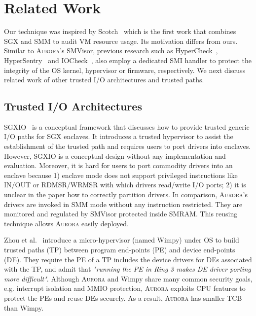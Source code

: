 \section{Related Work}
Our technique was inspired by Scotch~\cite{DBLP:conf/raid/LeachZW17} which is the first work that combines SGX and SMM to audit VM resource usage. Its motivation differs from ours.
Similar to \textsc{Aurora}'s SMVisor, previous research such as HyperCheck~\cite{DBLP:conf/raid/WangSG10}, HyperSentry~\cite{DBLP:conf/ccs/AzabNWJZS10} and IOCheck~\cite{DBLP:conf/esorics/ZhangWLS14}, also employ a dedicated SMI handler to protect the integrity of the OS kernel, hypervisor or firmware, respectively.
We next discuss related work of other trusted I/O architectures and trusted paths.

\subsection{Trusted I/O Architectures}
SGXIO~\cite{weiser_sgxio:_2017} is a conceptual framework that discusses how to provide trusted generic I/O paths for SGX enclaves. It introduces a trusted hypervisor to assist the establishment of the trusted path and requires users to port drivers into enclaves. However, SGXIO is a conceptual design without any implementation and evaluation. Moreover, it is hard for users to port commodity drivers into an enclave because 1) enclave mode does not support privileged instructions like IN/OUT or RDMSR/WRMSR with which drivers read/write I/O ports; 2) it is unclear in the paper \cite{weiser_sgxio:_2017} how to correctly partition drivers. In comparison, \textsc{Aurora}'s drivers are invoked in SMM mode without any instruction restricted. They are monitored and regulated by SMVisor protected inside SMRAM. This reusing technique allows \textsc{Aurora} easily deployed.

Zhou et al.~\cite{zhou_dancing_2014} introduce a micro-hypervisor (named Wimpy) under OS to build trusted paths (TP) between program end-points (PE) and device end-points (DE). They require the PE of a TP includes the device drivers for DEs associated with the TP, and admit that \textit{"running the PE in Ring 3 makes DE driver porting more difficult"}.  Although \textsc{Aurora} and Wimpy share many common security goals, e.g. interrupt isolation and MMIO protection, \textsc{Aurora} exploits CPU features to protect the PEs and reuse DEs securely. As a result, \textsc{Aurora} has smaller TCB than Wimpy. 

